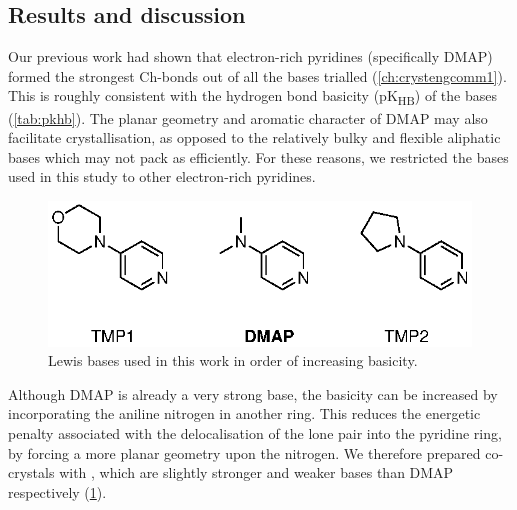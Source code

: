 \begin{refsection}
\section{Results and discussion}

  
Our previous work had shown that electron-rich pyridines (specifically DMAP) formed the strongest Ch-bonds out of all the bases trialled (\cref{ch:crystengcomm1}).
This is roughly consistent with the hydrogen bond basicity (pK\textsubscript{HB}) of the bases (\cref{tab:pkhb}).
The planar geometry and aromatic character of DMAP may also facilitate crystallisation, as opposed to the relatively bulky and flexible aliphatic bases which may not pack as efficiently.
For these reasons, we restricted the bases used in this study to other electron-rich pyridines.

\begin{figure}
  \centering
  \includegraphics[scale=0.74]{Figures/bases.eps}
  \caption[Lewis bases used in this work.]{Lewis bases used in this work in order of increasing basicity.}\label{fig:bases}
\end{figure}

Although DMAP is already a very strong base, the basicity can be increased by incorporating the aniline nitrogen in another ring.
This reduces the energetic penalty associated with the delocalisation of the lone pair into the pyridine ring, by forcing a more planar geometry upon the nitrogen.\autocite{Berthelot1998,Heinrich2003EnhancingFixation}
We therefore prepared co-crystals with , which are slightly stronger and weaker bases than DMAP respectively (\cref{fig:bases}).


\end{refsection}
